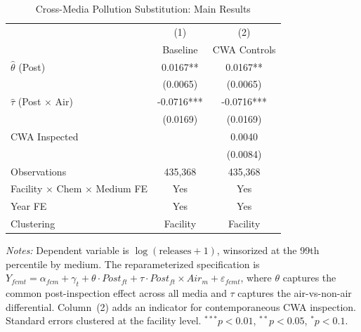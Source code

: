 \begin{table}[htbp]
\centering
\caption{Cross-Media Pollution Substitution: Main Results}
\label{tab:main}
\begin{tabular}{lcc}
\toprule
& (1) & (2) \\
& Baseline & CWA Controls \\
\midrule
$\hat{\theta}$ (Post) & 0.0167** & 0.0167** \\
& (0.0065) & (0.0065) \\[6pt]
$\hat{\tau}$ (Post $\times$ Air) & -0.0716*** & -0.0716*** \\
& (0.0169) & (0.0169) \\[6pt]
CWA Inspected & & 0.0040 \\
& & (0.0084) \\[6pt]
\midrule
Observations & 435,368 & 435,368 \\
Facility $\times$ Chem $\times$ Medium FE & Yes & Yes \\
Year FE & Yes & Yes \\
Clustering & Facility & Facility \\
\bottomrule
\end{tabular}
\begin{minipage}{0.95\textwidth}
\vspace{0.3em}
\footnotesize \textit{Notes:} Dependent variable is $\log(\text{releases} + 1)$, winsorized at the 99th percentile by medium. The reparameterized specification is $Y_{fcmt} = \alpha_{fcm} + \gamma_t + \theta \cdot \mathit{Post}_{ft} + \tau \cdot \mathit{Post}_{ft} \times \mathit{Air}_m + \varepsilon_{fcmt}$, where $\theta$ captures the common post-inspection effect across all media and $\tau$ captures the air-vs-non-air differential. Column~(2) adds an indicator for contemporaneous CWA inspection. Standard errors clustered at the facility level. $^{***}p<0.01$, $^{**}p<0.05$, $^{*}p<0.1$.
\end{minipage}
\end{table}
